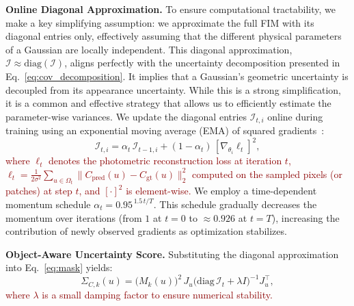 \documentclass{egpubl}
\newcommand{\rev}[1]{\textcolor{darkred}{#1}}
\newcommand{\tim}[1]{{\color[rgb]{0.8,0.2,0} Tim: #1}}
\begin{document}
\textbf{Online Diagonal Approximation.}
To ensure computational tractability, we make a key simplifying assumption: we approximate the full FIM with its diagonal entries only, effectively assuming that the different physical parameters of a Gaussian are locally independent. This diagonal approximation, $\mathcal{I} \approx \mathrm{diag}(\mathcal{I})$, aligns perfectly with the uncertainty decomposition presented in Eq.~\ref{eq:cov_decomposition}. It implies that a Gaussian's geometric uncertainty is decoupled from its appearance uncertainty. While this is a strong simplification, it is a common and effective strategy that allows us to efficiently estimate the parameter-wise variances. We update the diagonal entries $\mathcal{I}_{t,i}$ online during training using an exponential moving average (EMA) of squared gradients~\cite{kingma2017adammethodstochasticoptimization}:
\begin{equation}
\mathcal{I}_{t,i} = \alpha_t\,\mathcal{I}_{t-1,i} + (1 - \alpha_t)\,\left[\nabla_{\theta_i} \ell_t\right]^2,
\label{eq:fim_update}
\end{equation}
\rev{where $\ell_t$ denotes the photometric reconstruction loss at iteration $t$,
$\ell_t=\frac{1}{2\sigma^2}\sum_{u\in\Omega_t}\|C_{\text{pred}}(u)-C_{\text{gt}}(u)\|_2^2$ computed on the sampled pixels (or patches) at step $t$, and $[\cdot]^2$ is element-wise.}
We employ a time-dependent momentum schedule $\alpha_t = 0.95^{\,1.5\,t/T}$.
This schedule gradually decreases the momentum over iterations (from $1$ at $t{=}0$ to $\approx 0.926$ at $t{=}T$), increasing the contribution of newly observed gradients as optimization stabilizes.

\textbf{Object-Aware Uncertainty Score.}
Substituting the diagonal approximation into Eq.~\ref{eq:mask} yields:
\begin{equation}
\Sigma_{C,k}(u) = \bigl(M_k(u)\bigr)^{2}\,J_u \bigl(\mathrm{diag}\,\mathcal{I}_{t} + \lambda I\bigr)^{-1} J_u^{\!\top},
\label{eq:final_uncertainty}
\end{equation}
\rev{where $\lambda$ is a small damping factor to ensure numerical stability.}


\end{document}
